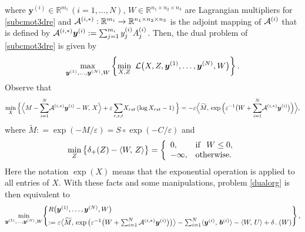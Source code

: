 \documentclass[10pt]{article}
\newcommand{\cA}{{\cal A}}
\newcommand{\inprod}[2]{\langle #1 , #2 \rangle }
\newcommand{\R}{\mathbb R}
\def\inprod#1#2{\langle#1,\,#2\rangle}
\def\Inprod#1#2{\Big\langle#1,\,#2\Big\rangle}
\begin{document}
where $ \bm{y}^{(i)}\in \R^{m_i}\,(i=1,\ldots,N)$, $W\in\mathbb{R}^{n_1 \times n_2 \times n_3}$ are Lagrangian multipliers for \eqref{subcmot3dre} and $\cA^{(i,*)}: \R^{m_i} \to \R^{n_1\times n_2\times n_3}$ is the adjoint mapping of $\cA^{(i)}$ that is defined by $\cA^{(i,*)} \bm{y}^{(i)} := \sum_{j=1}^{m_i} y^{(i)}_j A^{(i)}_j$. Then, the dual problem of \eqref{subcmot3dre} is given by
\begin{equation}\label{dualorg}
\max\limits_{\bm{y}^{(1)},\dots, \bm{y}^{(N)},W }\left\{\min\limits_{X,Z}~\mathcal{L}\big{(}X,Z, \bm{y}^{(1)},\dots, \bm{y}^{(N)},W \big{)}\right\}.
\end{equation}
Observe that
\begin{equation*}
\min_X\Big\{\Inprod{M-{\sum_{i=1}^N}\cA^{(i,*)}\bm{y}^{(i)} -W }{X}+ \varepsilon\,{\sum_{r,s,t}} X_{rst}\left(\log X_{rst} - 1\right) \Big\} = -\varepsilon \Inprod{\widetilde{M}}{\exp\Big( \varepsilon^{-1}\big( W+{\sum_{i=1}^N}\cA^{(i,*)}\bm{y}^{(i)} \big) \Big)},
\end{equation*}
where $\widetilde{M}: = \exp(-M/\varepsilon)= S\circ\exp(-C/\varepsilon)$ and
\begin{equation*}
\min\limits_{Z}\big{\{}\delta_+(Z) - \langle W, \,Z \rangle\big{\}} =
\left\{\begin{array}{ll}
0, &\mathrm{if}~~W \leq 0, \\
-\infty, &\mathrm{otherwise}.
\end{array}\right.
\end{equation*}
Here the notation $\exp(X)$ means that the exponential operation is applied to all entries of $X$. With these facts and some manipulations, problem \eqref{dualorg} is then equivalent to
\begin{eqnarray}\label{subcmot3dredual}
\min\limits_{ \bm{y}^{(1)},\dots, \bm{y}^{(N)},W} \!\left\{\!\!\!
\begin{array}{ll}
R\big{(} \bm{y}^{(1)},\dots, \bm{y}^{(N)},W\big{)}
\vspace{2mm}\\
:= \varepsilon
\big\langle \widetilde{M}, \,\exp\big( \varepsilon^{-1}\big( W+\sum_{i=1}^N\cA^{(i,*)}\bm{y}^{(i)} \big)\big)\big\rangle
- \sum_{i=1}^N\inprod{\bm{y}^{(i)}}{\bm{b}^{(i)}} - \inprod{W}{U} +  \delta_-(W)
\end{array}
\!\!\!\right\},
\end{eqnarray}
\end{document}

